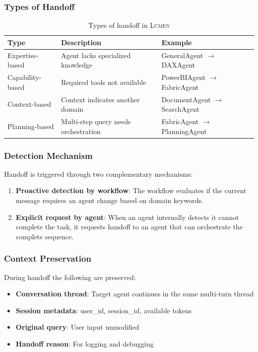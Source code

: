 \documentclass[11pt,a4paper]{article}
\theoremstyle{definition}
\theoremstyle{remark}
\newcommand{\lumen}{\textsc{Lumen}\xspace}
\begin{document}
\subsubsection{Types of Handoff}

\begin{table}[H]
\centering
\begin{tabular}{lll}
\toprule
\textbf{Type} & \textbf{Description} & \textbf{Example} \\
\midrule
Expertise-based & Agent lacks specialized knowledge & GeneralAgent $\rightarrow$ DAXAgent \\
Capability-based & Required tools not available & PowerBIAgent $\rightarrow$ FabricAgent \\
Context-based & Context indicates another domain & DocumentAgent $\rightarrow$ SearchAgent \\
Planning-based & Multi-step query needs orchestration & FabricAgent $\rightarrow$ PlanningAgent \\
\bottomrule
\end{tabular}
\caption{Types of handoff in \lumen}
\label{tab:handoff-types}
\end{table}

\subsubsection{Detection Mechanism}

Handoff is triggered through two complementary mechanisms:

\begin{enumerate}
    \item \textbf{Proactive detection by workflow}: The workflow evaluates if the current message requires an agent change based on domain keywords.

    \item \textbf{Explicit request by agent}: When an agent internally detects it cannot complete the task, it requests handoff to an agent that can orchestrate the complete sequence.
\end{enumerate}

\subsubsection{Context Preservation}

During handoff the following are preserved:
\begin{itemize}
    \item \textbf{Conversation thread}: Target agent continues in the same multi-turn thread
    \item \textbf{Session metadata}: user\_id, session\_id, available tokens
    \item \textbf{Original query}: User input unmodified
    \item \textbf{Handoff reason}: For logging and debugging
\end{itemize}
\end{document}
